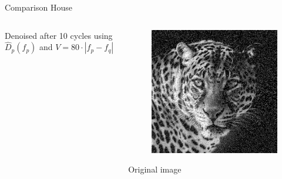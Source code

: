 \documentclass[mathserif]{beamer}
\newcommand{\appendixEnd}{
        \setcounter{framenumber}{\value{frameNumbersMain}}
}
\begin{document}
\begin{frame}{Comparison House}
\begin{columns}
\begin{column}{.3\textwidth}
\begin{figure}
            \end{figure}
                Denoised after 10 cycles using $\hat D_p(f_p)$ and $V=80\cdot|f_p-f_q|$  
        \end{column}
        \begin{column}{.3\textwidth}
            \begin{figure}
                \centering
                \includegraphics[width=\textwidth]{../testimages/leopard/v80_500_20/leopard_500_20percent.png}
            \end{figure}
                Original image
        \end{column}
    \end{columns}
\end{frame}




\appendixEnd
\end{document}
